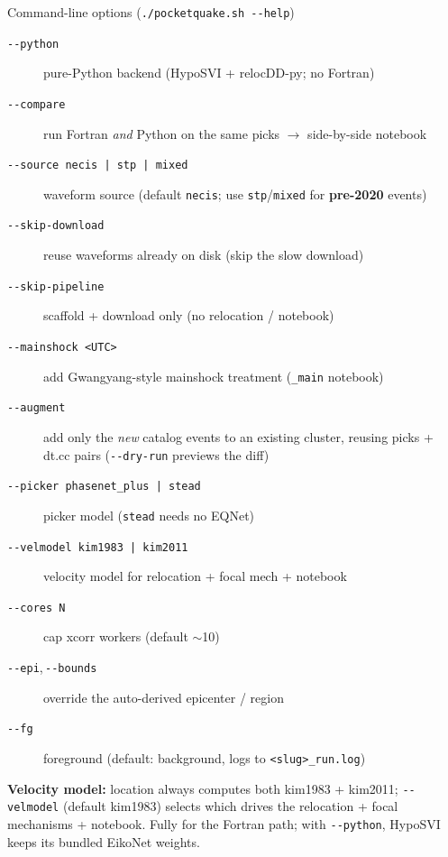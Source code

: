 \documentclass[10pt,aspectratio=169]{beamer}
\begin{document}
\begin{frame}[fragile]{Command-line options (\texttt{./pocketquake.sh -{}-help})}
\scriptsize
\begin{description}
  \item[\texttt{-{}-python}] pure-Python backend (HypoSVI + relocDD-py; no Fortran)
  \item[\texttt{-{}-compare}] run Fortran \emph{and} Python on the same picks $\to$ side-by-side notebook
  \item[\texttt{-{}-source necis\,|\,stp\,|\,mixed}] waveform source (default \texttt{necis}; use
        \texttt{stp}/\texttt{mixed} for \textbf{pre-2020} events)
  \item[\texttt{-{}-skip-download}] reuse waveforms already on disk (skip the slow download)
  \item[\texttt{-{}-skip-pipeline}] scaffold + download only (no relocation / notebook)
  \item[\texttt{-{}-mainshock <UTC>}] add Gwangyang-style mainshock treatment (\texttt{\_main} notebook)
  \item[\texttt{-{}-augment}] add only the \emph{new} catalog events to an existing cluster, reusing
        picks + dt.cc pairs (\texttt{-{}-dry-run} previews the diff)
  \item[\texttt{-{}-picker phasenet\_plus\,|\,stead}] picker model (\texttt{stead} needs no EQNet)
  \item[\texttt{-{}-velmodel kim1983\,|\,kim2011}] velocity model for relocation + focal mech + notebook
  \item[\texttt{-{}-cores N}] cap xcorr workers (default $\sim$10)
  \item[\texttt{-{}-epi},\,\texttt{-{}-bounds}] override the auto-derived epicenter / region
  \item[\texttt{-{}-fg}] foreground (default: background, logs to \texttt{<slug>\_run.log})
\end{description}
\smallskip
\textbf{Velocity model:} location always computes both kim1983 + kim2011; \texttt{-{}-velmodel}
(default kim1983) selects which drives the relocation + focal mechanisms + notebook. Fully for
the Fortran path; with \texttt{-{}-python}, HypoSVI keeps its bundled EikoNet weights.
\end{frame}
\end{document}
